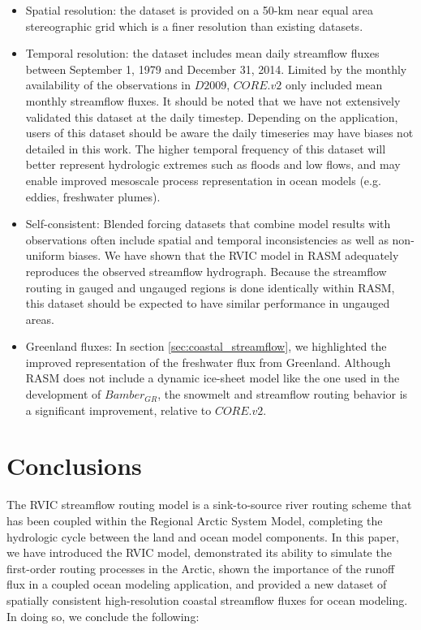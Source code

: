 \documentclass[jgrga, draft]{agutex}
\begin{document}
\begin{article}
\begin{itemize}[leftmargin=+.5in]
  \item Spatial resolution: the dataset is provided on a 50-km near equal area stereographic grid which is a finer resolution than existing datasets.
  \item Temporal resolution: the dataset includes mean daily streamflow fluxes between September 1, 1979 and December 31, 2014.
  Limited by the monthly availability of the observations in $D2009$, $CORE.v2$ only included mean monthly streamflow fluxes.
  It should be noted that we have not extensively validated this dataset at the daily timestep. Depending on the application, users of this dataset should be aware the daily timeseries may have biases not detailed in this work.
  The higher temporal frequency of this dataset will better represent hydrologic extremes such as floods and low flows, and may enable improved mesoscale process representation in ocean models (e.g. eddies, freshwater plumes).
  \item Self-consistent: Blended forcing datasets that combine model results with observations often include spatial and temporal inconsistencies as well as non-uniform biases. We have shown that the RVIC model in RASM adequately reproduces the observed streamflow hydrograph. Because the streamflow routing in gauged and ungauged regions is done identically within RASM, this dataset should be expected to have similar performance in ungauged areas.
  \item Greenland fluxes: In section \ref{sec:coastal_streamflow}, we highlighted the improved representation of the freshwater flux from Greenland. Although RASM does not include a dynamic ice-sheet model like the one used in the development of $Bamber_{GR}$, the snowmelt and streamflow routing behavior is a significant improvement, relative to $CORE.v2$.
\end{itemize}

\section{Conclusions}
\label{sec:conclusions}

The RVIC streamflow routing model is a sink-to-source river routing scheme that has been coupled within the Regional Arctic System Model, completing the hydrologic cycle between the land and ocean model components.
In this paper, we have introduced the RVIC model, demonstrated its ability to simulate the first-order routing processes in the Arctic, shown the  importance of the runoff flux in a coupled ocean modeling application, and provided a new dataset of spatially consistent high-resolution coastal streamflow fluxes for ocean modeling.
In doing so, we conclude the following:


\end{article}
\end{document}
